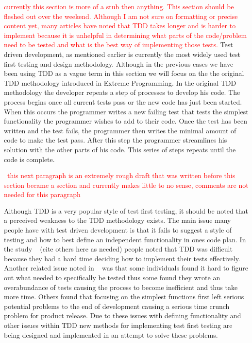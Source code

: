 \documentclass{sig-alternate}
\newcommand{\mycomment}[1]{\textcolor{red}{#1}}
\begin{document}
\mycomment{currently this section is more of a stub then anything. This section should be fleshed out over the weekend.  Although I am not sure on formatting or precise content yet, many articles have noted that TDD takes longer and is harder to implement because it is unhelpful in determining what parts of the code/problem need to be tested and what is the best way of implementing those tests.} 
Test driven development, as mentioned earlier is currently the most widely used test first testing and design methodology.  Although in the previous cases we have been using TDD as a vague term in this section we will focus on the the original TDD methodology introduced in Extreme Programming.  In the original TDD methodology the developer repeats a step of processes to develop his code.  The process begins once all current tests pass or the new code has just been started.  When this occurs the programmer writes a new failing test that tests the simplest functionality the programmer wishes to add to their code.  Once the test has been written and the test fails, the programmer then writes the minimal amount of code to make the test pass.  After this step the programmer streamlines his solution with the other parts of his code.  This series of steps repeats until the code is complete.

~\mycomment{this next paragraph is an extremely rough draft that was written before this section became a section and currently makes little to no sense, comments are not needed for this paragraph}

Although TDD is a very popular style of test first testing, it should be noted that a perceived weakness to the TDD methodology exists.  The main issue many people have with test driven development is that it fails to suggest a style of testing and how to best define an independent functionality in ones code plan.  In the study ~\cite{Kettunen:2010} (cite others here as needed) people noted that TDD was difficult because they had a hard time deciding how to implement their tests effectively.  Another related issue noted in ~\cite{Kettunen:2010} was that some individuals found it hard to figure out what needed to specifically be tested thus some found they wrote an overabundance of tests causing the process to become inefficient and thus take more time.  Others found that focusing on the simplest functions first left serious potential problems to the end of development causing a serious time crunch problem for product release.  Due to these issues with defining functionality and other issues within TDD new methods for implementing test first testing are being designed and implemented in an attempt to solve these problems.
\end{document}
